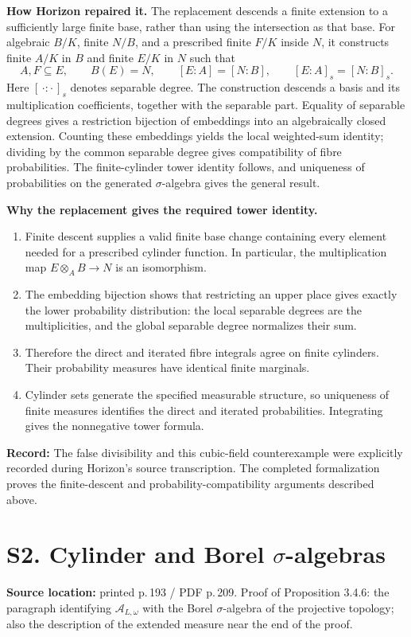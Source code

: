 \documentclass[10pt,a4paper]{article}
\newcommand{\loc}[2]{\textbf{Source location:} printed p.\,#1 / PDF p.\,#2.}
\newcommand{\hist}[1]{\par{\footnotesize\color{graytext}\textbf{Record:} #1}}
\newcommand{\A}{\mathcal A}
\begin{document}
\textbf{How Horizon repaired it.} The replacement descends a finite
extension to a sufficiently large finite base, rather than using the
intersection as that base. For algebraic $B/K$, finite $N/B$, and a
prescribed finite $F/K$ inside $N$, it constructs finite $A/K$ in $B$ and
finite $E/K$ in $N$ such that
\[
 A,F\subseteq E,\qquad B(E)=N,\qquad
 [E:A]=[N:B],\qquad [E:A]_s=[N:B]_s.
\]
Here $[\,\cdot:\cdot\,]_s$ denotes separable degree. The construction
descends a basis and its multiplication coefficients, together with the
separable part. Equality of separable degrees gives a restriction
bijection of embeddings into an algebraically closed extension.
Counting these embeddings yields the local weighted-sum identity;
dividing by the common separable degree gives compatibility of fibre
probabilities. The finite-cylinder tower identity follows, and uniqueness
of probabilities on the generated $\sigma$-algebra gives the general result.

\textbf{Why the replacement gives the required tower identity.}
\begin{enumerate}
\item Finite descent supplies a valid finite base change containing every
element needed for a prescribed cylinder function. In particular, the
multiplication map $E\otimes_A B\to N$ is an isomorphism.
\item The embedding bijection shows that restricting an upper place gives
exactly the lower probability distribution: the local separable degrees
are the multiplicities, and the global separable degree normalizes their sum.
\item Therefore the direct and iterated fibre integrals agree on finite
cylinders. Their probability measures have identical finite marginals.
\item Cylinder sets generate the specified measurable structure, so
uniqueness of finite measures identifies the direct and iterated
probabilities. Integrating gives the nonnegative tower formula.
\end{enumerate}
\hist{The false divisibility and this cubic-field counterexample were
explicitly recorded during Horizon's source transcription. The completed
formalization proves the finite-descent and probability-compatibility
arguments described above.}

\newpage
\section{S2. Cylinder and Borel \texorpdfstring{$\sigma$}{sigma}-algebras}\label{s2}
\loc{193}{209}
Proof of Proposition 3.4.6: the paragraph identifying
$\A_{L,\omega}$ with the Borel $\sigma$-algebra of the projective topology;
also the description of the extended measure near the end of the proof.
\end{document}
